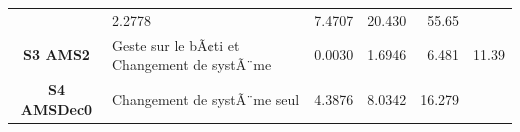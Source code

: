 \documentclass[]{article}
\begin{document}
\begin{longtable}[]{@{}clrrrr@{}}
\begin{minipage}[t]{0.29\columnwidth}
\end{minipage} & \begin{minipage}[t]{0.09\columnwidth}\raggedleft\strut
2.2778\strut
\end{minipage} & \begin{minipage}[t]{0.09\columnwidth}\raggedleft\strut
7.4707\strut
\end{minipage} & \begin{minipage}[t]{0.09\columnwidth}\raggedleft\strut
20.430\strut
\end{minipage} & \begin{minipage}[t]{0.09\columnwidth}\raggedleft\strut
55.65\strut
\end{minipage}\tabularnewline
\begin{minipage}[t]{0.17\columnwidth}\centering\strut
\textbf{S3 AMS2}\strut
\end{minipage} & \begin{minipage}[t]{0.29\columnwidth}\raggedright\strut
Geste sur le bÃ¢ti et Changement de systÃ¨me\strut
\end{minipage} & \begin{minipage}[t]{0.09\columnwidth}\raggedleft\strut
0.0030\strut
\end{minipage} & \begin{minipage}[t]{0.09\columnwidth}\raggedleft\strut
1.6946\strut
\end{minipage} & \begin{minipage}[t]{0.09\columnwidth}\raggedleft\strut
6.481\strut
\end{minipage} & \begin{minipage}[t]{0.09\columnwidth}\raggedleft\strut
11.39\strut
\end{minipage}\tabularnewline
\begin{minipage}[t]{0.17\columnwidth}\centering\strut
\textbf{S4 AMSDec0}\strut
\end{minipage} & \begin{minipage}[t]{0.29\columnwidth}\raggedright\strut
Changement de systÃ¨me seul\strut
\end{minipage} & \begin{minipage}[t]{0.09\columnwidth}\raggedleft\strut
4.3876\strut
\end{minipage} & \begin{minipage}[t]{0.09\columnwidth}\raggedleft\strut
8.0342\strut
\end{minipage} & \begin{minipage}[t]{0.09\columnwidth}\raggedleft\strut
16.279\strut
\end{minipage} & \begin{minipage}[t]{0.09\columnwidth}\raggedleft\strut

\end{minipage}
\end{longtable}
\end{document}
